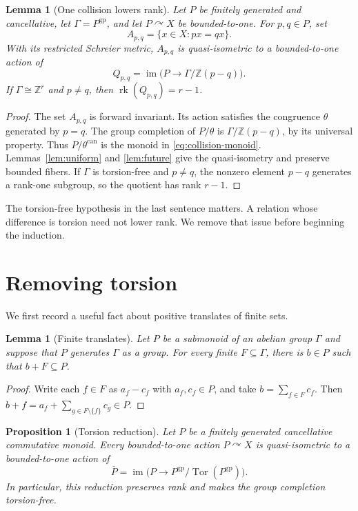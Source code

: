 \documentclass[10pt,a4paper]{amsart}
\newtheorem{lemma}[theorem]{Lemma}
\newtheorem{proposition}[theorem]{Proposition}
\DeclareMathOperator{\rk}{rk}
\DeclareMathOperator{\im}{im}
\DeclareMathOperator{\Tor}{Tor}
\newcommand{\ZZ}{\mathbb Z}
\newcommand{\gp}{\mathrm{gp}}
\newcommand{\act}{\curvearrowright}
\begin{document}
\begin{lemma}[One collision lowers rank]\label{lem:collision}
Let $P$ be finitely generated and cancellative, let $\Gamma=P^{\gp}$,
and let $P\act X$ be bounded-to-one. For $p,q\in P$, set
\[
 A_{p,q}=\{x\in X:px=qx\}.
\]
With its restricted Schreier metric, $A_{p,q}$ is quasi-isometric to a
bounded-to-one action of
\begin{equation}\label{eq:collision-monoid}
 Q_{p,q}=\im\bigl(P\longrightarrow\Gamma/\ZZ(p-q)\bigr).
\end{equation}
If $\Gamma\cong\ZZ^r$ and $p\ne q$, then $\rk(Q_{p,q})=r-1$.
\end{lemma}

\begin{proof}
The set $A_{p,q}$ is forward invariant. Its action satisfies the congruence
$\theta$ generated by $p=q$. The group completion of $P/\theta$ is
$\Gamma/\ZZ(p-q)$, by its universal property. Thus
$P/\theta^{\mathrm{can}}$ is the monoid in
\eqref{eq:collision-monoid}. Lemmas~\ref{lem:uniform} and
\ref{lem:future} give the quasi-isometry and preserve bounded fibers.
If $\Gamma$ is torsion-free and $p\ne q$, the nonzero element $p-q$
generates a rank-one subgroup, so the quotient has rank $r-1$.
\end{proof}

The torsion-free hypothesis in the last sentence matters. A relation
whose difference is torsion need not lower rank. We remove that issue
before beginning the induction.

\section{Removing torsion}\label{sec:torsion}

We first record a useful fact about positive translates of finite sets.

\begin{lemma}[Finite translates]\label{lem:translate}
Let $P$ be a submonoid of an abelian group $\Gamma$ and suppose that $P$
generates $\Gamma$ as a group. For every finite $F\subseteq\Gamma$, there
is $b\in P$ such that $b+F\subseteq P$.
\end{lemma}

\begin{proof}
Write each $f\in F$ as $a_f-c_f$ with $a_f,c_f\in P$, and take
$b=\sum_{f\in F}c_f$. Then
$b+f=a_f+\sum_{g\in F\setminus\{f\}}c_g\in P$.
\end{proof}

\begin{proposition}[Torsion reduction]\label{prop:torsion}
Let $P$ be a finitely generated cancellative commutative monoid. Every
bounded-to-one action $P\act X$ is quasi-isometric to a bounded-to-one
action of
\[
 \overline P=\im\bigl(P\longrightarrow P^{\gp}/\Tor(P^{\gp})\bigr).
\]
In particular, this reduction preserves rank and makes the group
completion torsion-free.
\end{proposition}
\end{document}

